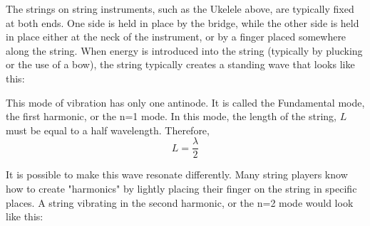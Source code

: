 	The strings on string instruments, such as the Ukelele above, are typically fixed at both ends.  One side is held in place by the bridge, while the other side is held in place either at the neck of the instrument, or by a finger placed somewhere along the string.  When energy is introduced into the string (typically by plucking or the use of a bow), the string typically creates a standing wave that looks like this:
	
	
		
		

	This mode of vibration has only one antinode.  It is called the Fundamental mode, the first harmonic, or the n=1 mode.    In this mode, the length of the string, $L$ must be equal to a half wavelength.  Therefore, 
	\begin{equation}
		L=\frac{\lambda}{2}
	\end{equation}
	
	
	It is possible to make this wave resonate differently.  Many string players know how to create "harmonics" by lightly placing their finger on the string in specific places.  A string vibrating in the second harmonic, or the n=2 mode would look like this:
	
